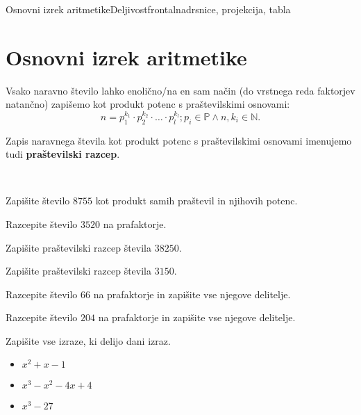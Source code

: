 \begin{priprava}{6}{}{Osnovni izrek aritmetike}{Deljivost}{frontalna}{drsnice, projekcija, tabla}


    \section{Osnovni izrek aritmetike}
    
    
        Vsako naravno število lahko enolično/na en sam način (do vrstnega reda faktorjev natančno) zapišemo kot produkt potenc s praštevilskimi osnovami:
        $$ n=p_1^{k_1}\cdot p_2^{k_2}\cdot\ldots\cdot p_l^{k_l};  p_i\in\mathbb{P}\land n, k_i\in\mathbb{N}.$$

    

        Zapis naravnega števila kot produkt potenc s praštevilskimi osnovami imenujemo tudi \textbf{praštevilski razcep}.
                

        ~\\
        \begin{naloga}
            Zapišite število $8755$ kot produkt samih praštevil in njihovih potenc. 
        \end{naloga}

        \begin{naloga}
            Razcepite število $3520$ na prafaktorje. 
        \end{naloga}

        \begin{naloga}
            Zapišite praštevilski razcep števila $38250$. 
        \end{naloga}

        \begin{naloga}
            Zapišite praštevilski razcep števila $3150$. 
        \end{naloga}
    
        \begin{naloga}
            Razcepite število $66$ na prafaktorje in zapišite vse njegove delitelje. 
        \end{naloga}

        \begin{naloga}
            Razcepite število $204$ na prafaktorje in zapišite vse njegove delitelje. 
        \end{naloga}
    
        \begin{naloga}
            Zapišite vse izraze, ki delijo dani izraz.
            \begin{itemize}
                \item $x^2+x-1$ 
                \item $x^3-x^2-4x+4$ 
                \item $x^3-27$ 
            \end{itemize}
        \end{naloga}
    
            
 


\end{priprava}